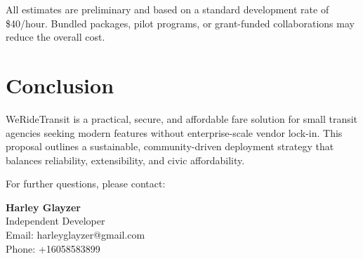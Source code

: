 \documentclass[12pt]{article}
\begin{document}
\vspace{1em}
\noindent All estimates are preliminary and based on a standard development rate of \$40/hour. Bundled packages, pilot programs, or grant-funded collaborations may reduce the overall cost.


\section{Conclusion}
WeRideTransit is a practical, secure, and affordable fare solution for small transit agencies seeking modern features without enterprise-scale vendor lock-in. This proposal outlines a sustainable, community-driven deployment strategy that balances reliability, extensibility, and civic affordability.

\vspace{1em}
\noindent For further questions, please contact:

\vspace{0.5em}
\noindent \textbf{Harley Glayzer} \\
Independent Developer \\
Email: harleyglayzer@gmail.com \\
Phone: +16058583899 \\
\end{document}

